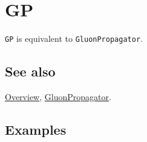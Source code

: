 \documentclass[../FeynCalcManual.tex]{subfiles}
\begin{document}
\hypertarget{gp}{
\section{GP}\label{gp}}

\texttt{GP} is equivalent to \texttt{GluonPropagator}.

\subsection{See also}

\hyperlink{toc}{Overview}, \hyperlink{gluonpropagator}{GluonPropagator}.

\subsection{Examples}
\end{document}
